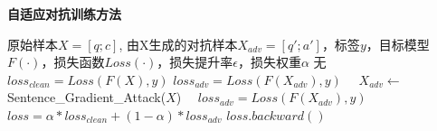 \renewcommand{\algorithmicrequire}{\textbf{输入:}}  
\renewcommand{\algorithmicensure}{\textbf{输出:}} 

\begin{algorithm}
	\caption{\textbf{自适应对抗训练方法}} 
	\label{alg3-1}
	\begin{algorithmic}
		\REQUIRE 原始样本$X=[q;c]$, 由X生成的对抗样本$X_{adv}=[q';a']$，标签$y$，目标模型$F(\cdot)$，损失函数$Loss(\cdot)$，损失提升率$\epsilon$，损失权重$\alpha$
		\ENSURE 无
        \STATE $loss_{clean} = Loss(F(X), y)$\; %
        \STATE $loss_{adv} = Loss(F(X_{adv}), y)$\;
            \STATE $\quad X_{adv} \leftarrow $ Sentence\_Gradient\_Attack($X$)\;
            \STATE $\quad loss_{adv} = Loss(F(X_{adv}), y)$\;
        \ENDIF
        \STATE $loss = \alpha*loss_{clean} + (1-\alpha) * loss_{adv}$\;
        \STATE $loss.backward()$\;
	\end{algorithmic}
\end{algorithm}

